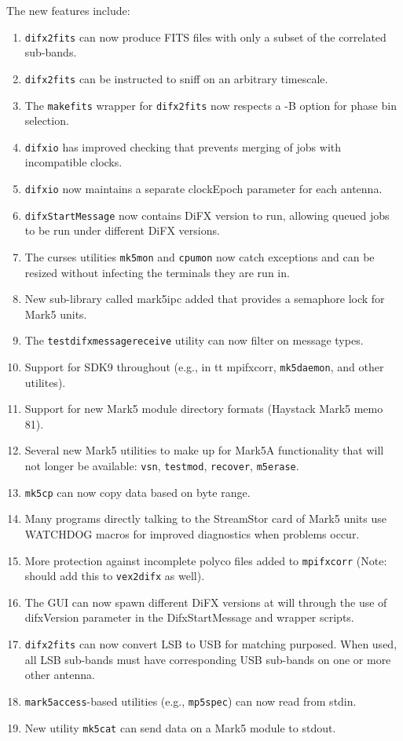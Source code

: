 The new features include:
\begin{enumerate}
\item {\tt difx2fits} can now produce FITS files with only a subset of the correlated sub-bands.
\item {\tt difx2fits} can be instructed to sniff on an arbitrary timescale.
\item The {\tt makefits} wrapper for {\tt difx2fits} now respects a -B option for phase bin selection.
\item {\tt difxio} has improved checking that prevents merging of jobs with incompatible clocks.
\item {\tt difxio} now maintains a separate clockEpoch parameter for each antenna.
\item {\tt difxStartMessage} now contains DiFX version to run, allowing queued jobs to be run under different DiFX versions.
\item The curses utilities {\tt mk5mon} and {\tt cpumon} now catch exceptions and can be resized without infecting the terminals they are run in.
\item New sub-library called mark5ipc added that provides a semaphore lock for Mark5 units.
\item The {\tt testdifxmessagereceive} utility can now filter on message types.
\item Support for SDK9 throughout (e.g., in {tt mpifxcorr}, {\tt mk5daemon}, and other utilites).
\item Support for new Mark5 module directory formats (Haystack Mark5 memo 81).
\item Several new Mark5 utilities to make up for Mark5A functionality that will not longer be available: {\tt vsn}, {\tt testmod}, {\tt recover}, {\tt m5erase}.
\item {\tt mk5cp} can now copy data based on byte range.
\item Many programs directly talking to the StreamStor card of Mark5 units use WATCHDOG macros for improved diagnostics when problems occur.
\item More protection against incomplete polyco files added to {\tt mpifxcorr} (Note: should add this to {\tt vex2difx} as well).
\item The GUI can now spawn different DiFX versions at will through the use of difxVersion parameter in the DifxStartMessage and wrapper scripts.
\item {\tt difx2fits} can now convert LSB to USB for matching purposed.  When used, all LSB sub-bands must have corresponding USB sub-bands on one or more other antenna.
\item {\tt mark5access}-based utilities (e.g., {\tt mp5spec}) can now read from stdin.
\item New utility {\tt mk5cat} can send data on a Mark5 module to stdout.
\end{enumerate}


